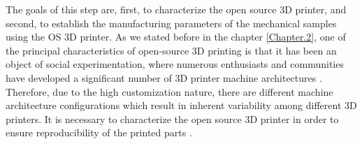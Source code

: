 The goals of this step are, first, to characterize the open source 3D printer, and second, to establish the manufacturing parameters of the mechanical samples using the OS 3D printer.
As we stated before in the chapter \ref{Chapter.2}, one of the principal characteristics of open-source 3D printing is that it has been an object of social experimentation, where numerous enthusiasts and communities have developed a significant number of  3D printer machine architectures \parencite{Kostakis2013}. 
Therefore, due to the high customization nature, there are different machine architecture configurations which result in inherent variability among different 3D printers.
It is necessary to characterize the open source 3D printer in order to ensure reproducibility of the printed parts \parencite{CruzSanchez2014}.



